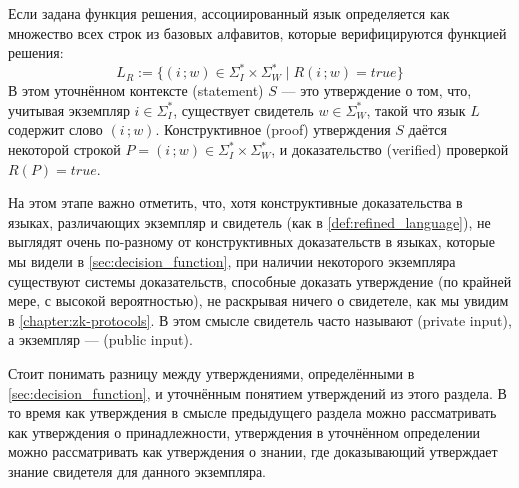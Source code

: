 Если задана функция решения, ассоциированный язык определяется как множество всех строк из базовых алфавитов, которые верифицируются функцией решения:
\begin{equation}
\label{def:refined_language}
L_R := \{(i\,;w)\in \Sigma_I^* \times \Sigma_W^* \;|\; R(i\,;w)=true\}
\end{equation}
В этом уточнённом контексте  (statement) $S$ — это утверждение о том, что, учитывая экземпляр $i\in\Sigma_I^*$, существует свидетель $w\in \Sigma_W^*$, такой что язык $L$ содержит слово $(i\,;w)$. Конструктивное  (proof) утверждения $S$ даётся некоторой строкой $P=(i\,; w) \in \Sigma_I^* \times \Sigma_W^*$, и доказательство  (verified) проверкой $R(P)=true$.

На этом этапе важно отметить, что, хотя конструктивные доказательства в языках, различающих экземпляр и свидетель (как в  \ref{def:refined_language}), не выглядят очень по-разному от конструктивных доказательств в языках, которые мы видели в \secname{} \ref{sec:decision_function}, при наличии некоторого экземпляра существуют системы доказательств, способные доказать утверждение (по крайней мере, с высокой вероятностью), не раскрывая ничего о свидетеле, как мы увидим в \chaptname{} \ref{chapter:zk-protocols}. В этом смысле свидетель часто называют  (private input), а экземпляр —  (public input).

Стоит понимать разницу между утверждениями, определёнными в \secname{} \ref{sec:decision_function}, и уточнённым понятием утверждений из этого раздела. В то время как утверждения в смысле предыдущего раздела можно рассматривать как утверждения о принадлежности, утверждения в уточнённом определении можно рассматривать как утверждения о знании, где доказывающий утверждает знание свидетеля для данного экземпляра.

